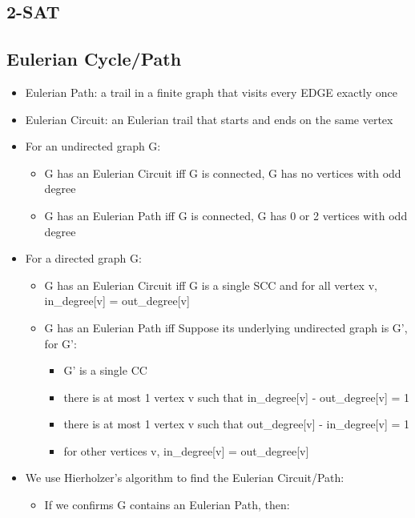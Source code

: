 \documentclass[10pt]{article}{\twocolumn}
\begin{document}
\subsection{2-SAT}

\subsection{Eulerian Cycle/Path}
\begin{itemize}
    \setlength\itemsep{0.1em}
    \item Eulerian Path: a trail in a finite graph that visits every EDGE exactly once
    \item Eulerian Circuit: an Eulerian trail that starts and ends on the same vertex
    \item For an undirected graph G:
    \begin{itemize}
        \setlength\itemsep{0.1em}
        \item G has an Eulerian Circuit iff G is connected, G has no vertices with odd degree
        \item G has an Eulerian Path iff G is connected, G has 0 or 2 vertices with odd degree
    \end{itemize}
    \item For a directed graph G:
    \begin{itemize}
        \setlength\itemsep{0.1em}
        \item G has an Eulerian Circuit iff G is a single SCC and for all vertex v, in\_degree[v] = out\_degree[v]
        \item G has an Eulerian Path iff Suppose its underlying undirected graph is G', for G':
        \begin{itemize}
            \setlength\itemsep{0.1em}
            \item G' is a single CC
            \item there is at most 1 vertex v such that in\_degree[v] - out\_degree[v] = 1
            \item there is at most 1 vertex v such that out\_degree[v] - in\_degree[v] = 1
            \item for other vertices v, in\_degree[v] = out\_degree[v]
        \end{itemize}
    \end{itemize}
    \item We use Hierholzer's algorithm to find the Eulerian Circuit/Path:
    \begin{itemize}
        \setlength\itemsep{0.1em}
        \item If we confirms G contains an Eulerian Path, then:

\end{itemize}
\end{itemize}
\end{document}
